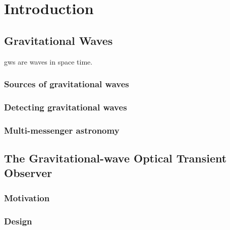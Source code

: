 \chapter{Introduction}
\label{chap:intro}
\chaptoc{}

\newpage
\section{Gravitational Waves}
\label{sec:gw}

\glspl{gw} are waves in space time.

\lipsum{}


\subsection{Sources of gravitational waves}
\label{sec:gw-sources}

\lipsum{}


\subsection{Detecting gravitational waves}
\label{sec:gw-detect}

\lipsum{}

\subsection{Multi-messenger astronomy}
\label{sec:gw-multimessenger}

\lipsum{}


\newpage
\section{The Gravitational-wave Optical Transient Observer}
\label{sec:goto}

\lipsum{}

\subsection{Motivation}
\label{sec:gw-motivation}

\lipsum{}

\subsection{Design}
\label{sec:gw-design}

\lipsum{}
